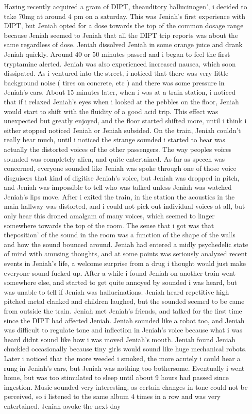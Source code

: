 \documentclass[12pt]{book}
\begin{document}
Having recently acquired a gram of DIPT, theauditory hallucinogen', i decided to take 70mg at around 4 pm on a saturday. This was Jeniah's first experience with DIPT, but Jeniah opted for a dose towards the top of the common dosage range because Jeniah seemed to Jeniah that all the DIPT trip reports was about the same regardless of dose. Jeniah dissolved Jeniah in some orange juice and drank Jeniah quickly. Around 40 or 50 minutes passed and i began to feel the first tryptamine alerted. Jeniah was also experienced increased nausea, which soon dissipated. As i ventured into the street, i noticed that there was very little background noise ( tires on concrete, etc ) and there was some pressure in Jeniah's ears. About 15 minutes later, when i was at a train station, i noticed that if i relaxed Jeniah's eyes when i looked at the pebbles on the floor, Jeniah would start to shift with the fluidity of a good acid trip. This effect was unexpected but greatly enjoyed, and the floor started shifted more, until i think i either stopped noticed Jeniah or Jeniah subsided. On the train, Jeniah couldn't really hear much, until i noticed the strange sounded i started to hear was actually the distorted voices of the other passengers. The way peoples voices sounded was completely alien, and quite entertained. As far as speech was concerned, everyone sounded like Jeniah was spoke through one of those voice disguisers that kind of digitise Jeniah's voice, but Jeniah was dropped in pitch, and Jeniah was impossible to tell who was talked unless Jeniah was watched Jeniah's lips move. After i exited the train, in the station the acoustics in the main hallway was distorted, and i could not pick out individual voices at all, but only hear this droned amalgam of many voices, which seemed to linger somewhere towards the top of the room. The sense that i got was that theposition' of the sound in the room was a function of the shape of the walls and how the sound bounced around. Jeniah had entered a midly psychedelic state of mind with amusing thoughts, and at some points was seriously analyzed recent events in Jeniah's life, a welcome surprise from a drug i thought would just make everyone sound fucked up. After a while i found Jeniah on another train went somewhere else, and started to get quite annoyed by sounded i was heard, but was unable to tell if Jeniah was hallucinations. Jeniah heard repetitive high pitched metal clanked and children laughed, but the sounded seemed to be came from outside the train. Jeniah met Jeniah's friends, and talked for the first time since the DIPT had affected Jeniah. Jeniah sounded like a robot too, and Jeniah was difficult to regulate tone and inflection in Jeniah's voice because what i was heard didnt sound like how i was moved Jeniah's mouth. Jeniah found Jeniah chuckled occasionally because tiny girls would sound like huge mechanical robots. Later i noticed that the more weeded i smoked, the more acutely i could hear a rung in Jeniah's ears, but Jeniah was nothing too bothersome. Eventually i went home, but was too stimulated to sleep until about 9 hours had passed since ingestion. Music sounded very interesting, as certain changes in tone could not be perceived, so i listened to the same album 4 times in a row and was very entertained. Jeniah awoke the next day 
\end{document}

